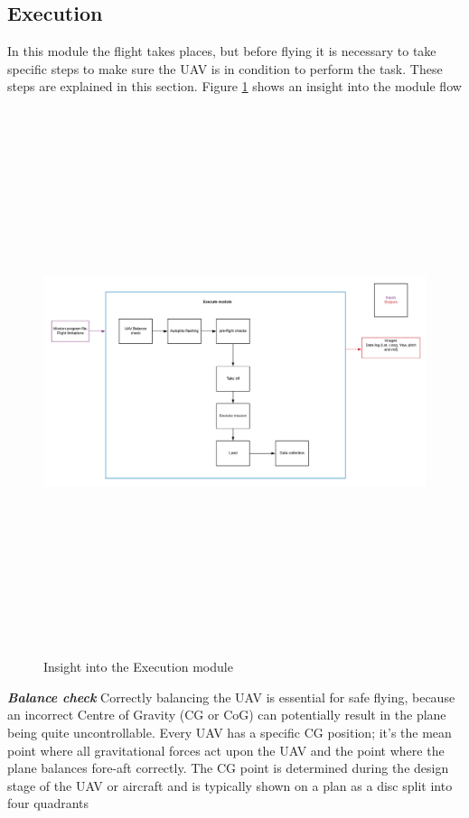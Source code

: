 \subsection{Execution}
In this module the flight takes places, but before flying it is necessary to take specific steps to make sure the UAV is in condition to perform the task. These steps are explained in this section.  Figure \ref{fig:execute} shows an insight into the module flow
\begin{figure}[H]
\centering
\includegraphics[width=16cm,height=16cm,keepaspectratio]{imagenes/Execution.png}
\caption{Insight into the Execution module}
\label{fig:execute}
\end{figure}
\textit{\textbf{Balance check}} \newline
Correctly balancing the UAV is essential for safe flying, because an incorrect Centre of Gravity (CG or CoG) can potentially result in the plane being quite uncontrollable. Every UAV  has a specific CG position; it's the mean point where all gravitational forces act upon the UAV and the point where the plane balances fore-aft correctly. The CG point is determined during the design stage of the UAV or aircraft and is typically shown on a plan as a disc split into four quadrants

